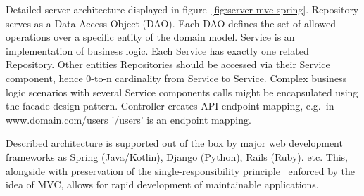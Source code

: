 Detailed server architecture displayed in figure~\ref{fig:server-mvc-spring}.
Repository serves as a Data Access Object (DAO).
Each DAO defines the set of allowed operations over a specific entity of the domain model.
Service is an implementation of business logic.
Each Service has exactly one related Repository.
Other entities Repositories should be accessed via their Service component, hence 0-to-n cardinality from Service to Service.
Complex business logic scenarios with several Service components calls might be encapsulated using the facade design pattern.
Controller creates API endpoint mapping, e.g.\ in www.domain.com/users '/users' is an endpoint mapping.

Described architecture is supported out of the box by major web development frameworks as Spring (Java/Kotlin), Django (Python), Rails (Ruby).\cite{spring,django,ruby} etc.
This, alongside with preservation of the single-responsibility principle~\cite{wiki-srp} enforced by the idea of MVC, allows for rapid development of maintainable applications.